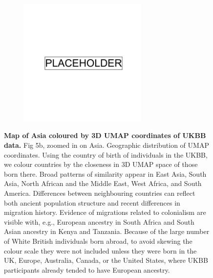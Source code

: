 \begin{figure}
    \centering
    \begin{subfigure}{\textwidth}
    \includegraphics[width=0.7\textwidth]{placeholder.png}
    \end{subfigure}
    \caption[Map of Asia coloured by 3D UMAP coordinates of UKBB data]{\textbf{Map of Asia coloured by 3D UMAP coordinates of UKBB data.} Fig 5b, zoomed in on Asia. Geographic distribution of UMAP coordinates. Using the country of birth of individuals in the UKBB, we colour countries by the closeness in 3D UMAP space of those born there. Broad patterns of similarity appear in East Asia, South Asia, North African and the Middle East, West Africa, and South America. Differences between neighbouring countries can reflect both ancient population structure and recent differences in migration history. Evidence of migrations related to colonialism are visible with, e.g., European ancestry in South Africa and South Asian ancestry in Kenya and Tanzania. Because of the large number of White British individuals born abroad, to avoid skewing the colour scale they were not included unless they were born in the UK, Europe, Australia, Canada, or the United States, where UKBB participants already tended to have European ancestry.}
    \label{fig:supp_umap_ukbb_asia}
\end{figure}

\newpage

